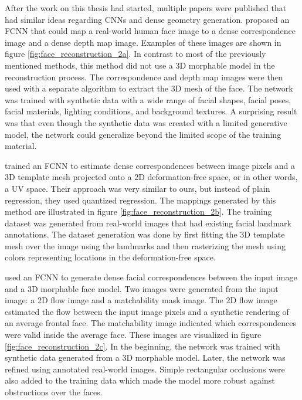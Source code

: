 After the work on this thesis had started, multiple papers were published that had similar ideas regarding \acp{CNN} and dense geometry generation. \textcite{Sela2017} proposed an \ac{FCNN} that could map a real-world human face image to a dense correspondence image and a dense depth map image. Examples of these images are shown in figure \ref{fig:face_reconstruction_2a}. In contrast to most of the previously mentioned methods, this method did not use a 3D morphable model in the reconstruction process. The correspondence and depth map images were then used with a separate algorithm to extract the 3D mesh of the face. The network was trained with synthetic data with a wide range of facial shapes, facial poses, facial materials, lighting conditions, and background textures. A surprising result was that even though the synthetic data was created with a limited generative model, the network could generalize beyond the limited scope of the training material.

\textcite{Guler2016} trained an \ac{FCNN} to estimate dense correspondences between image pixels and a 3D template mesh projected onto a 2D deformation-free space, or in other words, a UV space. Their approach was very similar to ours, but instead of plain regression, they used quantized regression. The mappings generated by this method are illustrated in figure \ref{fig:face_reconstruction_2b}. The training dataset was generated from real-world images that had existing facial landmark annotations. The dataset generation was done by first fitting the 3D template mesh over the image using the landmarks and then rasterizing the mesh using colors representing locations in the deformation-free space.

\textcite{Yu2017} used an \ac{FCNN} to generate dense facial correspondences between the input image and a 3D morphable face model. Two images were generated from the input image: a 2D flow image and a matchability mask image. The 2D flow image estimated the flow between the input image pixels and a synthetic rendering of an average frontal face. The matchability image indicated which correspondences were valid inside the average face. These images are visualized in figure \ref{fig:face_reconstruction_2c}. In the beginning, the network was trained with synthetic data generated from a 3D morphable model. Later, the network was refined using annotated real-world images. Simple rectangular occlusions were also added to the training data which made the model more robust against obstructions over the faces.

